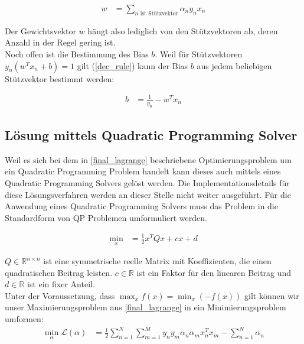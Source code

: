 \documentclass[a4paper,11pt,twoside]{scrreprt}
\newcommand{\Lagr}{\mathcal{L}}
\begin{document}
\begin{equation} \label{weights_calc2}
	\begin{aligned}
		w &= \sum_{n \text{ ist Stützvektor}} \alpha_{n} y_{n} x_{n}
	\end{aligned}
\end{equation}

Der Gewichtsvektor $w$ hängt also lediglich von den Stützvektoren ab, deren Anzahl in der Regel gering ist.\\


Noch offen ist die Bestimmung des Bias $b$. Weil für Stützvektoren $y_n (w^{T} x_{n} + b) = 1$ gilt (\autoref{dec_rule}) kann der Bias $b$ aus jedem beliebigen Stützvektor bestimmt werden:

\begin{equation} \label{bias_calc}
	\begin{aligned}
		b &= \frac{1}{y_{n}} - w^{T} x_{n}
	\end{aligned}
\end{equation}

\subsection{Lösung mittels Quadratic Programming Solver}

Weil es sich bei dem in \autoref{final_lagrange} beschriebene Optimierungsproblem um ein Quadratic Programming Problem handelt kann dieses auch mittels eines Quadratic Programming Solvers gelöst werden. Die Implementationsdetails für diese Lösungsverfahren werden an dieser Stelle nicht weiter ausgeführt. Für die Anwendung eines Quadratic Programming Solvers muss das Problem in die Standardform von \ac{QP} Problemen umformuliert werden.

\begin{equation} \label{std_QP_problem}
	\begin{aligned}
		\min_{x} &= \frac{1}{2} x^{T} Q x + c x + d 
	\end{aligned}
\end{equation}

$Q \in \mathbb{R}^{n \times n}$ ist eine symmetrische reelle Matrix mit Koeffizienten, die einen quadratischen Beitrag leisten. $c \in \mathbb{R}$ ist ein Faktor für den linearen Beitrag und $d \in \mathbb{R}$ ist ein fixer Anteil. \\

Unter der Voraussetzung, dass $\max_{x} f(x) = \min_{x} (-f(x))$ gilt können wir unser Maximierungsproblem aus \autoref{final_lagrange} in ein Minimierungsproblem umformen:
\begin{equation} \label{qp_adapt1}
	\begin{aligned}
		\min_{\alpha} \Lagr(\alpha) &= \frac{1}{2} \sum_{n=1}^{N} \sum_{m=1}^{M} y_{n} y_{m} \alpha_{n} \alpha_{m} x_{n}^{T} x_{m} - \sum_{n=1}^{N} \alpha_{n}
	\end{aligned}
\end{equation}
\end{document}
